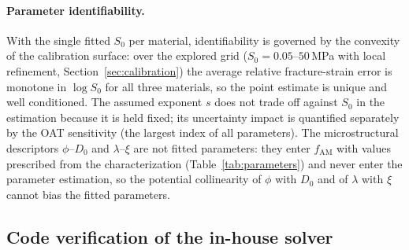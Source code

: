 \documentclass[twocolumn]{sagej}
\begin{document}
\paragraph{Parameter identifiability.} With the single fitted $S_0$ per material, identifiability is governed by the convexity of the calibration surface: over the explored grid ($S_0 = 0.05$--$50$\,MPa with local refinement, Section~\ref{sec:calibration}) the average relative fracture-strain error is monotone in $\log S_0$ for all three materials, so the point estimate is unique and well conditioned. The assumed exponent $s$ does not trade off against $S_0$ in the estimation because it is held fixed; its uncertainty impact is quantified separately by the OAT sensitivity (the largest index of all parameters). The microstructural descriptors $\phi$--$D_0$ and $\lambda$--$\xi$ are not fitted parameters: they enter $f_{\mathrm{AM}}$ with values prescribed from the characterization (Table~\ref{tab:parameters}) and never enter the parameter estimation, so the potential collinearity of $\phi$ with $D_0$ and of $\lambda$ with $\xi$ cannot bias the fitted parameters.

\subsection{Code verification of the in-house solver}
\label{sec:code_verification}
\end{document}

